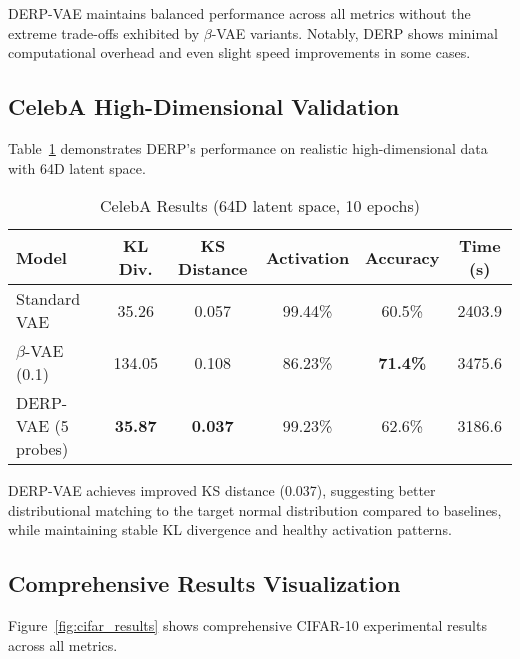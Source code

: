 \documentclass[11pt]{article}
\begin{document}
DERP-VAE maintains balanced performance across all metrics without the extreme trade-offs exhibited by $\beta$-VAE variants. Notably, DERP shows minimal computational overhead and even slight speed improvements in some cases.

\subsection{CelebA High-Dimensional Validation}

Table~\ref{tab:celeba_results} demonstrates DERP's performance on realistic high-dimensional data with 64D latent space.

\begin{table}[ht]
\centering
\caption{CelebA Results (64D latent space, 10 epochs)}
\label{tab:celeba_results}
\begin{tabular}{@{}lccccc@{}}
\toprule
\textbf{Model} & \textbf{KL Div.} & \textbf{KS Distance} & \textbf{Activation} & \textbf{Accuracy} & \textbf{Time (s)} \\
\midrule
Standard VAE & 35.26 & 0.057 & 99.44\% & 60.5\% & 2403.9 \\
$\beta$-VAE (0.1) & 134.05 & 0.108 & 86.23\% & \textbf{71.4\%} & 3475.6 \\
DERP-VAE (5 probes) & \textbf{35.87} & \textbf{0.037} & 99.23\% & 62.6\% & 3186.6 \\
\bottomrule
\end{tabular}
\end{table}

DERP-VAE achieves improved KS distance (0.037), suggesting better distributional matching to the target normal distribution compared to baselines, while maintaining stable KL divergence and healthy activation patterns.

\subsection{Comprehensive Results Visualization}

Figure~\ref{fig:cifar_results} shows comprehensive CIFAR-10 experimental results across all metrics.

\end{document}
